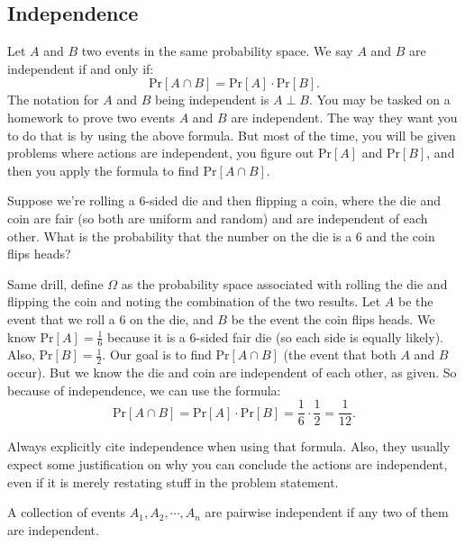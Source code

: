 \documentclass[11pt]{scrartcl}
\begin{document}
\subsection{Independence}

Let $A$ and $B$ two events in the same probability space. We say $A$ and $B$ are independent if and only if: \[\text{Pr}[A \cap B] = \text{Pr}[A] \cdot \text{Pr}[B].\] The notation for $A$ and $B$ being independent is $A \perp B$. You may be tasked on a homework to prove two events $A$ and $B$ are independent. The way they want you to do that is by using the above formula. But most of the time, you will be given problems where actions are independent, you figure out $\text{Pr}[A]$ and $\text{Pr}[B]$, and then you apply the formula to find $\text{Pr}[A \cap B]$.

\begin{example}
Suppose we're rolling a 6-sided die and then flipping a coin, where the die and coin are fair (so both are uniform and random) and are independent of each other. What is the probability that the number on the die is a 6 and the coin flips heads?
\end{example}

Same drill, define $\Omega$ as the probability space associated with rolling the die and flipping the coin and noting the combination of the two results. Let $A$ be the event that we roll a 6 on the die, and $B$ be the event the coin flips heads. We know $\text{Pr}[A] = \frac{1}{6}$ because it is a 6-sided fair die (so each side is equally likely). Also, $\text{Pr}[B] = \frac{1}{2}$. Our goal is to find $\text{Pr}[A \cap B]$ (the event that both $A$ and $B$ occur). But we know the die and coin are independent of each other, as given. So because of independence, we can use the formula: \[\text{Pr}[A \cap B] = \text{Pr}[A] \cdot \text{Pr}[B] = \frac{1}{6} \cdot \frac{1}{2} = \frac{1}{12}.\]

\begin{caveat}
Always explicitly cite independence when using that formula. Also, they usually expect some justification on why you can conclude the actions are independent, even if it is merely restating stuff in the problem statement.
\end{caveat}

\begin{definition}
    A collection of events $A_1, A_2, \cdots, A_n$ are pairwise independent if any two of them are independent.
\end{definition}
\end{document}
